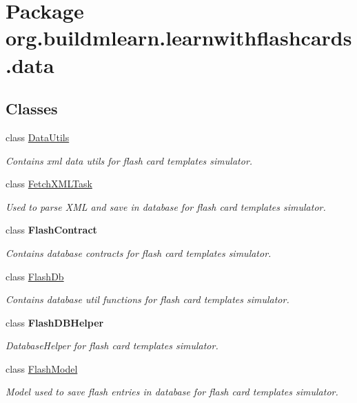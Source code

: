 \hypertarget{namespaceorg_1_1buildmlearn_1_1learnwithflashcards_1_1data}{}\section{Package org.\+buildmlearn.\+learnwithflashcards.\+data}
\label{namespaceorg_1_1buildmlearn_1_1learnwithflashcards_1_1data}
\subsection*{Classes}
\begin{DoxyCompactItemize}
\item 
class \hyperlink{classorg_1_1buildmlearn_1_1learnwithflashcards_1_1data_1_1DataUtils}{Data\+Utils}
\begin{DoxyCompactList}\small\item\em Contains xml data utils for flash card template\textquotesingle{}s simulator. \end{DoxyCompactList}\item 
class \hyperlink{classorg_1_1buildmlearn_1_1learnwithflashcards_1_1data_1_1FetchXMLTask}{Fetch\+X\+M\+L\+Task}
\begin{DoxyCompactList}\small\item\em Used to parse X\+ML and save in database for flash card template\textquotesingle{}s simulator. \end{DoxyCompactList}\item 
class {\bfseries Flash\+Contract}
\begin{DoxyCompactList}\small\item\em Contains database contracts for flash card template\textquotesingle{}s simulator. \end{DoxyCompactList}\item 
class \hyperlink{classorg_1_1buildmlearn_1_1learnwithflashcards_1_1data_1_1FlashDb}{Flash\+Db}
\begin{DoxyCompactList}\small\item\em Contains database util functions for flash card template\textquotesingle{}s simulator. \end{DoxyCompactList}\item 
class {\bfseries Flash\+D\+B\+Helper}
\begin{DoxyCompactList}\small\item\em Database\+Helper for flash card template\textquotesingle{}s simulator. \end{DoxyCompactList}\item 
class \hyperlink{classorg_1_1buildmlearn_1_1learnwithflashcards_1_1data_1_1FlashModel}{Flash\+Model}
\begin{DoxyCompactList}\small\item\em Model used to save flash entries in database for flash card template\textquotesingle{}s simulator. \end{DoxyCompactList}\end{DoxyCompactItemize}
